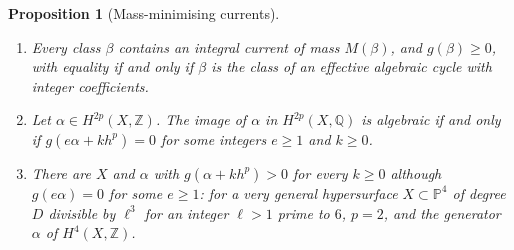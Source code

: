 \documentclass[11pt,reqno]{amsart}
\numberwithin{equation}{section}
\theoremstyle{plain}
\newtheorem{proposition}[theorem]{Proposition}
\theoremstyle{definition}
\newcommand{\QQ}{\mathbb{Q}}
\newcommand{\ZZ}{\mathbb{Z}}
\newcommand{\PP}{\mathbb{P}}
\begin{document}
\begin{proposition}[Mass-minimising currents]\label{prop:mass}
\leavevmode
\begin{enumerate}[label=\textup{(\roman*)},leftmargin=2.4em,itemsep=2pt]
\item Every class $\beta$ contains an integral current of mass $M(\beta)$, and $g(\beta)\ge0$, with equality if and only if $\beta$ is the class of an effective algebraic cycle with integer coefficients.
\item Let $\alpha\in H^{2p}(X,\ZZ)$. The image of $\alpha$ in $H^{2p}(X,\QQ)$ is algebraic if and only if $g(e\alpha+kh^{p})=0$ for some integers $e\ge1$ and $k\ge0$.
\item There are $X$ and $\alpha$ with $g(\alpha+kh^{p})>0$ for every $k\ge0$ although $g(e\alpha)=0$ for some $e\ge1$: for a very general hypersurface $X\subset\PP^{4}$ of degree $D$ divisible by $\ell^{3}$ for an integer $\ell>1$ prime to $6$, $p=2$, and the generator $\alpha$ of $H^{4}(X,\ZZ)$.
\end{enumerate}
\end{proposition}
\end{document}
